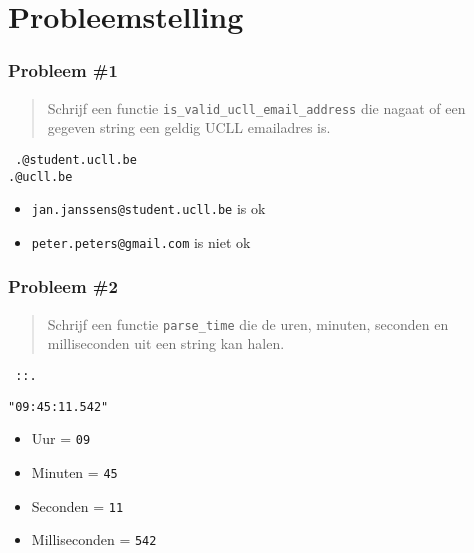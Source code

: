 \section{Probleemstelling}

\frame{\tableofcontents[currentsection]}

\begin{frame}
  \frametitle{Probleem \#1}
  \begin{quote}
    Schrijf een functie \texttt{is\_valid\_ucll\_email\_address}
    die nagaat of een gegeven string een geldig UCLL emailadres is.
  \end{quote}
  \vskip2mm
  \begin{center}\tt
    .@student.ucll.be \\
    .@ucll.be \\
  \end{center}
  \vskip2mm
  \begin{itemize}
    \item {\tt jan.janssens@student.ucll.be} is ok
    \item {\tt peter.peters@gmail.com} is niet ok
  \end{itemize}
\end{frame}

\begin{frame}
  \frametitle{Probleem \#2}
  \begin{quote}
    Schrijf een functie \texttt{parse\_time} die
    de uren, minuten, seconden en milliseconden uit
    een string kan halen.
  \end{quote}
  \vskip2mm
  \begin{center}\tt
    ::.
  \end{center}
  \vskip2mm
  \begin{center}
    \texttt{"09:45:11.542"}
  \end{center}
  \begin{itemize}
    \item Uur = \texttt{09}
    \item Minuten = \texttt{45}
    \item Seconden = \texttt{11}
    \item Milliseconden = \texttt{542}
  \end{itemize}
\end{frame}

